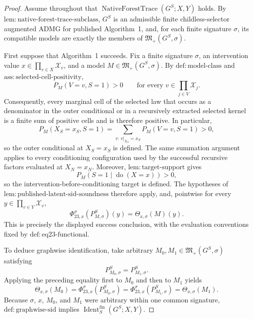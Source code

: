 \documentclass{article}
\begin{document}
\begin{proof}
Assume throughout that \(\operatorname{NativeForestTrace}(G^S;X,Y)\) holds.  By \(\mathrm{lem:native\text{-}forest\text{-}trace\text{-}subclass}\), \(G^S\) is an admissible finite childless-selector augmented ADMG for published Algorithm~1, and, for each finite signature \(\sigma\), its compatible models are exactly the members of \(\mathfrak M_+(G^S,\sigma)\).

First suppose that Algorithm~1 succeeds.  Fix a finite signature \(\sigma\), an intervention value \(x\in\prod_{v\in X}\mathcal X_v\), and a model \(M\in\mathfrak M_+(G^S,\sigma)\).  By \(\mathrm{def:model\text{-}class}\) and \(\mathrm{ass:selected\text{-}cell\text{-}positivity}\),
\[
 P_M(V=v,S=1)>0
 \qquad\text{for every }v\in\prod_{j\in V}\mathcal X_j.
\]
Consequently, every marginal cell of the selected law that occurs as a denominator in the outer conditional or in a recursively extracted selected kernel is a finite sum of positive cells and is therefore positive.  In particular,
\[
 P_M(X_S=x_S,S=1)
 =\sum_{v:\,v|_{X_S}=x_S}P_M(V=v,S=1)>0,
\]
so the outer conditional at \(X_S=x_S\) is defined.  The same summation argument applies to every conditioning configuration used by the successful recursive factors evaluated at \(X_N=x_N\).  Moreover, \(\mathrm{lem:target\text{-}support}\) gives
\[
 P_M(S=1\mid\operatorname{do}(X=x))>0,
\]
so the intervention-before-conditioning target is defined.  The hypotheses of \(\mathrm{lem:published\text{-}latent\text{-}sid\text{-}soundness}\) therefore apply, and, pointwise for every \(y\in\prod_{v\in Y}\mathcal X_v\),
\[
 \Phi_{23,x}^{\sigma}(P_{M,\sigma}^S)(y)
 =\Theta_{x,\sigma}(M)(y).
\]
This is precisely the displayed success conclusion, with the evaluation conventions fixed by \(\mathrm{def:eq23\text{-}functional}\).

To deduce graphwise identification, take arbitrary \(M_0,M_1\in\mathfrak M_+(G^S,\sigma)\) satisfying
\[
 P_{M_0,\sigma}^S=P_{M_1,\sigma}^S.
\]
Applying the preceding equality first to \(M_0\) and then to \(M_1\) yields
\[
 \Theta_{x,\sigma}(M_0)
 =\Phi_{23,x}^{\sigma}(P_{M_0,\sigma}^S)
 =\Phi_{23,x}^{\sigma}(P_{M_1,\sigma}^S)
 =\Theta_{x,\sigma}(M_1).
\]
Because \(\sigma\), \(x\), \(M_0\), and \(M_1\) were arbitrary within one common signature, \(\mathrm{def:graphwise\text{-}sid}\) implies \(\operatorname{Ident}^{\mathrm{fin}}_S(G^S;X,Y)\).


\end{proof}
\end{document}
